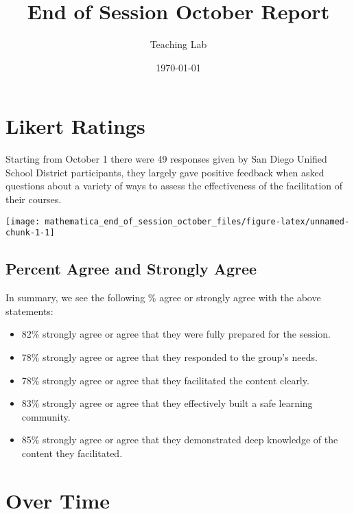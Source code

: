 \documentclass[10,a4paperpaper,]{article}
\title{End of Session October Report}
\author{Teaching Lab}
\date{\today}
\begin{document}
\renewcommand{\contentsname}{Table of Contents}

\renewcommand{\pagename}{Page}


\maketitle
\tableofcontents
{}
\clearpage

\section{Likert Ratings}

Starting from October 1 there were 49 responses given by San Diego
Unified School District participants, they largely gave positive
feedback when asked questions about a variety of ways to assess the
effectiveness of the facilitation of their courses.

\begin{center}\texttt{[image: mathematica\_end\_of\_session\_october\_files/figure-latex/unnamed-chunk-1-1]} \end{center}

\subsection{Percent Agree and Strongly Agree}

In summary, we see the following \% agree or strongly agree with the
above statements:

\begin{itemize}
\tightlist
\item
  82\% strongly agree or agree that they were fully prepared for the
  session.
\item
  78\% strongly agree or agree that they responded to the group's needs.
\item
  78\% strongly agree or agree that they facilitated the content
  clearly.
\item
  83\% strongly agree or agree that they effectively built a safe
  learning community.
\item
  85\% strongly agree or agree that they demonstrated deep knowledge of
  the content they facilitated.
\end{itemize}

\section{Over Time}
\end{document}
